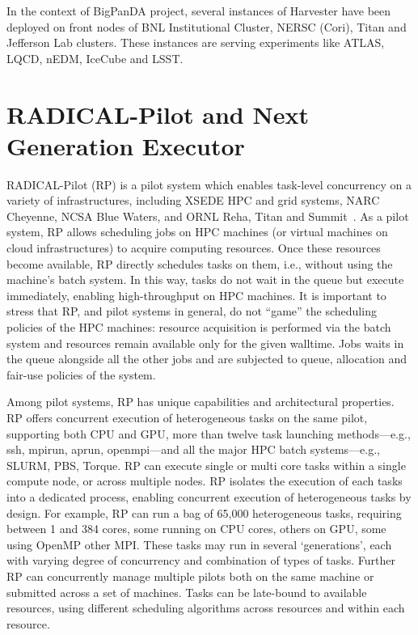 \documentclass{webofc}
\begin{document}
In the context of BigPanDA project, several instances of Harvester have been
deployed on front nodes of BNL Institutional Cluster, NERSC (Cori), Titan and
Jefferson Lab clusters. These instances are serving experiments like ATLAS,
LQCD, nEDM, IceCube and LSST.


\section{RADICAL-Pilot and Next Generation Executor}\label{sec:rp}

RADICAL-Pilot (RP) is a pilot system which enables task-level concurrency on
a variety of infrastructures, including XSEDE HPC and grid systems, NARC
Cheyenne, NCSA Blue Waters, and ORNL Reha, Titan and
Summit~\cite{merzky2018using}. As a pilot system, RP allows scheduling jobs
on HPC machines (or virtual machines on cloud infrastructures) to acquire
computing resources. Once these resources become available, RP directly
schedules tasks on them, i.e., without using the machine’s batch system. In
this way, tasks do not wait in the queue but execute immediately, enabling
high-throughput on HPC machines. It is important to stress that RP, and pilot
systems in general, do not ``game'' the scheduling policies of the HPC
machines: resource acquisition is performed via the batch system and
resources remain available only for the given walltime. Jobs waits in the
queue alongside all the other jobs and are subjected to queue, allocation and
fair-use policies of the system.
	
Among pilot systems, RP has unique capabilities and architectural properties.
RP offers concurrent execution of heterogeneous tasks on the same pilot,
supporting both CPU and GPU, more than twelve task launching methods---e.g.,
ssh, mpirun, aprun, openmpi---and all the major HPC batch systems---e.g.,
SLURM, PBS, Torque. RP can execute single or multi core tasks within a single
compute node, or across multiple nodes. RP isolates the execution of each
tasks into a dedicated process, enabling concurrent execution of
heterogeneous tasks by design. For example, RP can run a bag of 65,000
heterogeneous tasks, requiring between 1 and 384 cores, some running on CPU
cores, others on GPU, some using OpenMP other MPI. These tasks may run in
several ‘generations’, each with varying degree of concurrency and
combination of types of tasks. Further RP can concurrently manage multiple
pilots both on the same machine or submitted across a set of machines. Tasks
can be late-bound to available resources, using different scheduling
algorithms across resources and within each resource.
	
\end{document}
